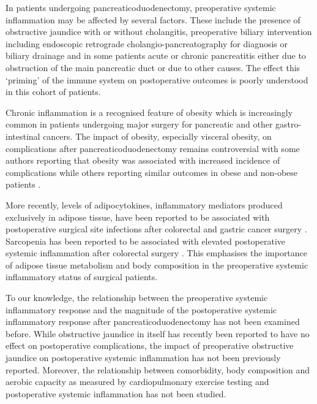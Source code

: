 In patients undergoing pancreaticoduodenectomy, preoperative systemic inflammation may be affected by several factors. 
These include the presence of obstructive jaundice with or without cholangitis, preoperative biliary intervention including endoscopic retrograde cholangio-pancreatography for diagnosis or biliary drainage and in some patients acute or chronic pancreatitis either due to obstruction of the main pancreatic duct or due to other causes. 
The effect this `priming' of the immune system on postoperative outcomes is poorly understood in this cohort of patients. 

Chronic inflammation is a recognised feature of obesity which is increasingly common in patients undergoing major surgery for pancreatic and other gastro-intestinal cancers. 
The impact of obesity, especially visceral obesity, on complications after pancreaticoduodenectomy remains controversial with some authors reporting that obesity was associated with increased incidence of complications \parencite{house_preoperative_2008, ramsey_body_2011} while others reporting similar outcomes in obese and non-obese patients \parencite{khan_does_2010, tsai_impact_2010, balentine_obesity_2011}. 

More recently, levels of adipocytokines, inflammatory mediators produced exclusively in adipose tissue, have been reported to be associated with postoperative surgical site infections after colorectal \parencite{ortega-deballon_preoperative_2013, matsuda_preoperative_2009} and gastric cancer surgery \parencite{yamamoto_association_2013}.
Sarcopenia has been reported to be associated with  elevated postoperative systemic inflammation after colorectal surgery \parencite{reisinger_sarcopenia_2015}.
This emphasises the importance of adipose tissue metabolism and body composition in the preoperative systemic inflammatory status of surgical patients. 

To our knowledge, the relationship between the preoperative systemic inflammatory response and the magnitude of the postoperative systemic inflammatory response after pancreaticoduodenectomy has not been examined before. 
While obstructive jaundice in itself has recently been reported to have no effect on postoperative complications, the impact of preoperative obstructive jaundice on postoperative systemic inflammation has not been previously reported. 
Moreover, the relationship between comorbidity, body composition and aerobic capacity as measured by cardiopulmonary exercise testing and postoperative systemic inflammation has not been studied. 


